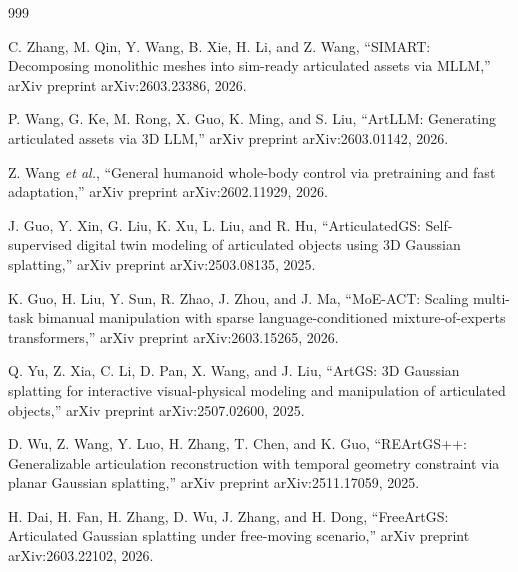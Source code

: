 \documentclass[11pt,a4paper]{article}
\begin{document}
\begin{thebibliography}{999}

C. Zhang, M. Qin, Y. Wang, B. Xie, H. Li, and Z. Wang, ``{SIMART}: Decomposing monolithic meshes into sim-ready articulated assets via {MLLM},'' arXiv preprint arXiv:2603.23386, 2026.




P. Wang, G. Ke, M. Rong, X. Guo, K. Ming, and S. Liu, ``ArtLLM: Generating articulated assets via {3D} LLM,'' arXiv preprint arXiv:2603.01142, 2026.




Z. Wang \textit{et al.}, ``General humanoid whole-body control via pretraining and fast adaptation,'' arXiv preprint arXiv:2602.11929, 2026.




J. Guo, Y. Xin, G. Liu, K. Xu, L. Liu, and R. Hu, ``{ArticulatedGS}: Self-supervised digital twin modeling of articulated objects using {3D} Gaussian splatting,'' arXiv preprint arXiv:2503.08135, 2025.




K. Guo, H. Liu, Y. Sun, R. Zhao, J. Zhou, and J. Ma, ``MoE-ACT: Scaling multi-task bimanual manipulation with sparse language-conditioned mixture-of-experts transformers,'' arXiv preprint arXiv:2603.15265, 2026.




Q. Yu, Z. Xia, C. Li, D. Pan, X. Wang, and J. Liu, ``{ArtGS}: {3D} Gaussian splatting for interactive visual-physical modeling and manipulation of articulated objects,'' arXiv preprint arXiv:2507.02600, 2025.




D. Wu, Z. Wang, Y. Luo, H. Zhang, T. Chen, and K. Guo, ``{REArtGS++}: Generalizable articulation reconstruction with temporal geometry constraint via planar Gaussian splatting,'' arXiv preprint arXiv:2511.17059, 2025.




H. Dai, H. Fan, H. Zhang, D. Wu, J. Zhang, and H. Dong, ``{FreeArtGS}: Articulated Gaussian splatting under free-moving scenario,'' arXiv preprint arXiv:2603.22102, 2026.




\end{thebibliography}
\end{document}
